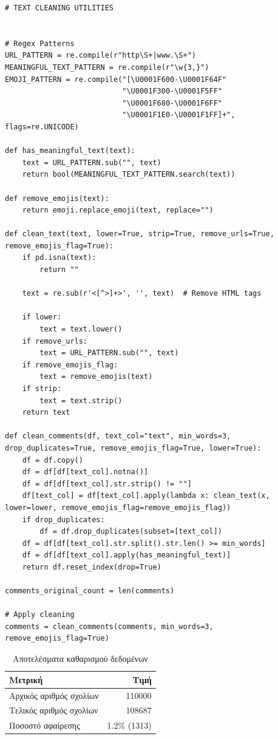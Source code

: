 \documentclass[a4paper,11pt,oneside,openany]{ioniothesis}
\begin{document}
\begin{lstlisting}[caption={Text cleaning}, label={lst:clean_text}]
# TEXT CLEANING UTILITIES


# Regex Patterns
URL_PATTERN = re.compile(r"http\S+|www.\S+")
MEANINGFUL_TEXT_PATTERN = re.compile(r"\w{3,}")
EMOJI_PATTERN = re.compile("[\U0001F600-\U0001F64F"
                           "\U0001F300-\U0001F5FF"
                           "\U0001F680-\U0001F6FF"
                           "\U0001F1E0-\U0001F1FF]+", flags=re.UNICODE)

def has_meaningful_text(text):
    text = URL_PATTERN.sub("", text)
    return bool(MEANINGFUL_TEXT_PATTERN.search(text))

def remove_emojis(text):
    return emoji.replace_emoji(text, replace="")

def clean_text(text, lower=True, strip=True, remove_urls=True, remove_emojis_flag=True):
    if pd.isna(text):
        return ""

    text = re.sub(r'<[^>]+>', '', text)  # Remove HTML tags
        
    if lower:
        text = text.lower()
    if remove_urls:
        text = URL_PATTERN.sub("", text)
    if remove_emojis_flag:
        text = remove_emojis(text)
    if strip:
        text = text.strip()
    return text

def clean_comments(df, text_col="text", min_words=3, drop_duplicates=True, remove_emojis_flag=True, lower=True):
    df = df.copy()
    df = df[df[text_col].notna()]
    df = df[df[text_col].str.strip() != ""]
    df[text_col] = df[text_col].apply(lambda x: clean_text(x, lower=lower, remove_emojis_flag=remove_emojis_flag))
    if drop_duplicates:
        df = df.drop_duplicates(subset=[text_col])
    df = df[df[text_col].str.split().str.len() >= min_words]
    df = df[df[text_col].apply(has_meaningful_text)]
    return df.reset_index(drop=True)

comments_original_count = len(comments)

# Apply cleaning
comments = clean_comments(comments, min_words=3, remove_emojis_flag=True)
\end{lstlisting}

\begin{table}[H]
\centering
\caption{Αποτελέσματα καθαρισμού δεδομένων}
\label{tab:cleaning_results}
\begin{tabular}{@{}lr@{}}
\toprule
\textbf{Μετρική} & \textbf{Τιμή} \\
\midrule
Αρχικός αριθμός σχολίων & 110000 \\
Τελικός αριθμός σχολίων & 108687 \\
Ποσοστό αφαίρεσης & 1.2\% (1313) \\
\bottomrule
\end{tabular}
\end{table}
\end{document}
